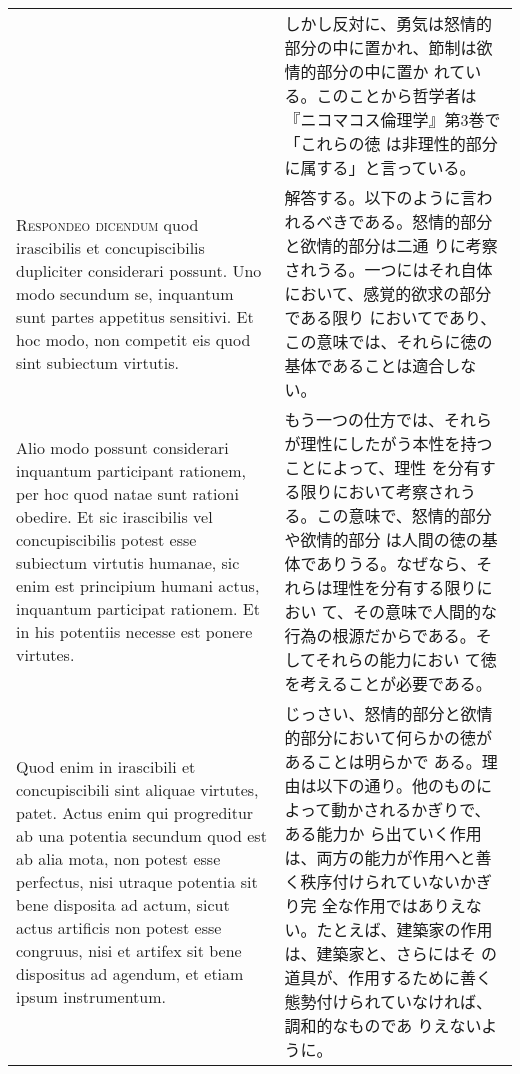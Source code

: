 \documentclass[10pt]{jsarticle}
\begin{document}
\begin{longtable}{p{21em}p{21em}}
&

しかし反対に、勇気は怒情的部分の中に置かれ、節制は欲情的部分の中に置か
れている。このことから哲学者は『ニコマコス倫理学』第3巻で「これらの徳
は非理性的部分に属する」と言っている。

\\



{\scshape Respondeo dicendum} quod irascibilis et concupiscibilis
dupliciter considerari possunt. Uno modo secundum se, inquantum sunt
partes appetitus sensitivi. Et hoc modo, non competit eis quod sint
subiectum virtutis.


&

解答する。以下のように言われるべきである。怒情的部分と欲情的部分は二通
りに考察されうる。一つにはそれ自体において、感覚的欲求の部分である限り
においてであり、この意味では、それらに徳の基体であることは適合しない。

\\



Alio modo possunt considerari inquantum participant rationem, per hoc
quod natae sunt rationi obedire. Et sic irascibilis vel
concupiscibilis potest esse subiectum virtutis humanae, sic enim est
principium humani actus, inquantum participat rationem. Et in his
potentiis necesse est ponere virtutes.


&

もう一つの仕方では、それらが理性にしたがう本性を持つことによって、理性
を分有する限りにおいて考察されうる。この意味で、怒情的部分や欲情的部分
は人間の徳の基体でありうる。なぜなら、それらは理性を分有する限りにおい
て、その意味で人間的な行為の根源だからである。そしてそれらの能力におい
て徳を考えることが必要である。

\\


Quod enim in irascibili et concupiscibili sint aliquae virtutes,
patet. Actus enim qui progreditur ab una potentia secundum quod est ab
alia mota, non potest esse perfectus, nisi utraque potentia sit bene
disposita ad actum, sicut actus artificis non potest esse congruus,
nisi et artifex sit bene dispositus ad agendum, et etiam ipsum
instrumentum.

&

じっさい、怒情的部分と欲情的部分において何らかの徳があることは明らかで
ある。理由は以下の通り。他のものによって動かされるかぎりで、ある能力か
ら出ていく作用は、両方の能力が作用へと善く秩序付けられていないかぎり完
全な作用ではありえない。たとえば、建築家の作用は、建築家と、さらにはそ
の道具が、作用するために善く態勢付けられていなければ、調和的なものであ
りえないように。


\end{longtable}
\end{document}
